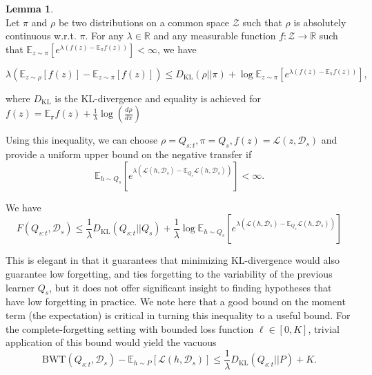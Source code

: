 \documentclass[letterpaper]{article}
\theoremstyle{definition}
\newtheorem{lemma}{Lemma}[section]
\begin{document}
\begin{lemma} \label{lemma:concentration} \cite{shui2020beyond} \\
	Let $\pi$ and $\rho$ be two distributions on a common space $\mathcal{Z}$ such that $\rho$ is absolutely continuous w.\!r.\!t.\! $\pi$. For any $\lambda\in \mathbb{R}$ and any measurable function $f:\mathcal{Z}\rightarrow \mathbb{R}$ such that $\mathbb{E}_{z\sim \pi}\left [e^{\lambda(f(z)-\mathbb{E}_\pi f(z))} \right ]<\infty$, we have
	
	\begin{equation}
	\lambda\left (\mathbb{E}_{z\sim \rho}\left [f(z) \right ]-\mathbb{E}_{z\sim \pi}\left [f(z) \right ]\right )\leq D_{\mathrm{KL}}(\rho||\pi)+ \log\mathbb{E}_{z\sim \pi}\left [e^{\lambda(f(z)-\mathbb{E}_\pi f(z))} \right ],
	\end{equation}
	
	where $D_{\mathrm{KL}}$ is the KL-divergence and equality is achieved for $f(z)=\mathbb{E}_\pi f(z)+\frac{1}{\lambda}\log(\frac{d\rho}{d\pi})$
\end{lemma}

Using this inequality, we can choose $\rho=Q_{s:t}, \pi=Q_s, f(z)=\mathcal{L}(z,\mathcal{D}_s)$ and provide a uniform upper bound on the negative transfer if $$\mathbb{E}_{h\sim Q_s}\left [e^{\lambda(\mathcal{L}(h,\mathcal{D}_s)-\mathbb{E}_{Q_s} \mathcal{L}(h,\mathcal{D}_s))} \right ]<\infty.$$

We have 
\begin{equation*}
F(Q_{s:t},\mathcal{D}_s)\leq \frac{1}{\lambda}D_{\mathrm{KL}}(Q_{s:t}||Q_s)+\frac{1}{\lambda}\log\mathbb{E}_{h\sim Q_s}\left [e^{\lambda(\mathcal{L}(h,\mathcal{D}_s)-\mathbb{E}_{Q_s} \mathcal{L}(h,\mathcal{D}_s))} \right ]
\end{equation*}

This is elegant in that it guarantees that minimizing KL-divergence would also guarantee low forgetting, and ties forgetting to the variability of the previous learner $Q_s$, but it does not offer significant insight to finding hypotheses that have low forgetting in practice. We note here that a good bound on the moment term (the expectation) is critical in turning this inequality to a useful bound. For the complete-forgetting setting with bounded loss function $\ell\in [0,K]$, trivial application of this bound would yield the vacuous $$\mathrm{BWT}(Q_{s:t},\mathcal{D}_s)-\mathbb{E}_{h\sim P}\left [\mathcal{L}(h,\mathcal{D}_s)\right ]\leq  \frac{1}{\lambda}D_{\mathrm{KL}}(Q_{s:t}||P)+K.$$
\end{document}
